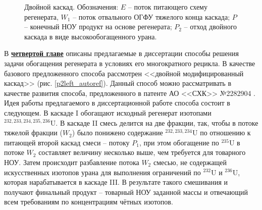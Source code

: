 \begin{figure}[ht]
  \caption{Двойной каскад. Обозначения: $E$ -- поток питающего схему регенерата, $W_1$ -- поток отвального ОГФУ тяжелого конца каскада; $P$ -- конечный НОУ продукт на основе регенерата; $P_2$ -- отход двойного каскада в виде высокообогащенного урана.}\label{fig:double_ru_in3}
\end{figure}


В \underline{\textbf{четвертой главе}} описаны предлагаемые в диссертации способы решения задачи обогащения регенерата в условиях его многократного рецикла.
В качестве базового предложенного способа рассмотрен <<двойной модифицированный каскад>> (рис. \ref{p2left_autoref}). Данный способ можно рассматривать в качестве развития способа, предложенного в патенте АО <<СХК>> №2282904 \cite{vodolazskihSposobIzotopnogoVosstanovleniya2006}. Идея работы предлагаемого в диссертационной работе способа состоит в следующем. В каскаде I обогащают исходный регенерат изотопами $^{232,233,234,235,236}$U. В каскаде II смесь делится на две фракции, так, чтобы в потоке тяжелой фракции ($W_2$) было понижено содержание $^{232,233,234}$U по отношению к питающей второй каскад смеси -- потоку $P_1$, при этом обогащение по $^{235}$U в потоке $W_2$ составляет величину несколько выше, чем требуется для товарного НОУ. Затем происходит разбавление потока $W_2$ смесью, не содержащей искусственных изотопов урана для выполнения ограничений по $^{232}$U и $^{236}$U, которая нарабатывается в каскаде III. В результате такого смешивания и получают финальный продукт -- товарный НОУ заданной массы и отвечающий всем требованиям по концентрациям чётных изотопов. 


